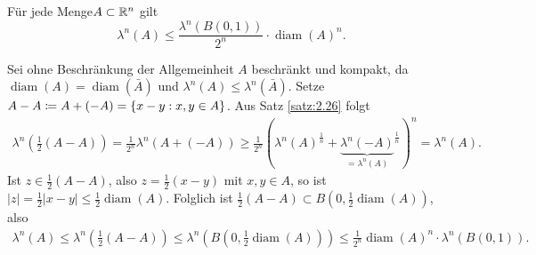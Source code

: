 \documentclass[a4paper,twoside,DIV15,BCOR12mm]{scrbook}
\DeclareMathOperator{\diam}{diam}
\begin{document}
\begin{satz}
\label{satz:2.27}
Für jede Menge$A\subset \mathbb{R}^n$ gilt
\[
\lambda^n(A)  \le \frac{\lambda^n(B(0,1))}{2^n} \cdot \diam(A)^n.
\]
\end{satz}

\begin{beweis}
Sei ohne Beschränkung der Allgemeinheit $A$ beschränkt und kompakt, da $\diam(A) = \diam(\bar A)$ und $\lambda^n(A) \le \lambda^n(\bar A)$. Setze $A-A \da A + (-A) = \{ x-y : x,y\in A\}$. Aus Satz \ref{satz:2.26} folgt
\begin{align*}
\lambda^n(\frac12(A-A)) = \frac1{2^n} \lambda^n(A + (-A)) \ge \frac 1{2^n} \left(\lambda^n(A)^{\frac1n} + {\underbrace{\lambda^n(-A)}_{=\lambda^n(A)}}^{\frac1n}\right)^n = \lambda^n(A).
\end{align*}
Ist $z\in\frac12(A-A)$, also $z=\frac12(x-y)$ mit $x,y\in A$, so ist $|z| = \frac 12 |x-y| \le \frac12 \diam(A)$. Folglich ist $\frac12(A-A) \subset B(0,\frac12\diam(A))$, also
\begin{align*}
\lambda^n(A) \le \lambda^n(\frac12(A-A)) \le \lambda^n(B(0,\frac12\diam(A))) \le \frac1{2^n} \diam(A)^n \cdot \lambda^n(B(0,1)).
\end{align*}
\end{beweis}
\end{document}
